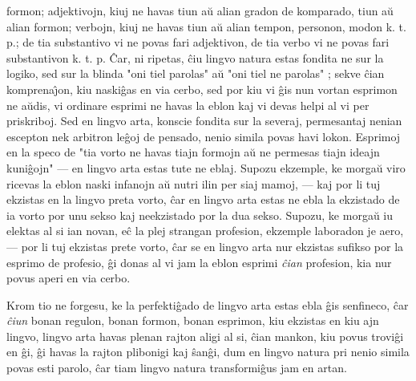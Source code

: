 formon; adjektivojn, kiuj ne havas tiun a\u u alian gradon de
komparado, tiun a\u u alian formon; verbojn, kiuj ne havas tiun a\u
u alian tempon, personon, modon k. t. p.; de tia substantivo vi ne
povas fari adjektivon, de tia verbo vi ne povas fari substantivon k.
t. p. \^Car, ni ripetas, \^ciu lingvo natura estas fondita ne sur la
logiko, sed sur la blinda "oni tiel parolas" a\u u "oni tiel ne
parolas" ; sekve \^cian komprena\^{\j}on, kiu naski\^gas en via
cerbo, sed por kiu vi \^gis nun vortan esprimon ne a\u udis, vi
ordinare esprimi ne havas la eblon kaj vi devas helpi al vi per
priskriboj. Sed en lingvo arta, konscie fondita sur la severaj,
permesantaj nenian escepton nek arbitron le\^goj de pensado, nenio
simila povas havi lokon. Esprimoj en la speco de "tia vorto ne
havas tiajn formojn a\u u ne permesas tiajn ideajn kuni\^gojn" ---
en lingvo arta estas tute ne eblaj. Supozu ekzemple, ke morga\u u
viro ricevas la eblon naski infanojn a\u u nutri ilin per siaj
mamoj, --- kaj por li tuj ekzistas en la lingvo preta vorto, \^car
en lingvo arta estas ne ebla la ekzistado de ia vorto por unu sekso
kaj neekzistado por la dua sekso. Supozu, ke morga\u u iu elektas al
si ian novan, e\^c la plej strangan profesion, ekzemple laboradon je
aero, --- por li tuj ekzistas prete vorto, \^car se en lingvo arta
nur ekzistas sufikso por la esprimo de profesio, \^gi donas al vi
jam la eblon esprimi {\sl \^cian} profesion, kia nur povus aperi en
via cerbo.

   Krom tio ne forgesu, ke la perfekti\^gado de lingvo arta estas
ebla \^gis senfineco, \^car {\sl \^ciun} bonan regulon, bonan
formon, bonan esprimon, kiu ekzistas en kiu ajn lingvo, lingvo arta
havas plenan rajton aligi al si, \^cian mankon, kiu povus trovi\^gi
en \^gi, \^gi havas la rajton plibonigi kaj \^san\^gi, dum en lingvo
natura pri nenio simila povas esti parolo, \^car tiam lingvo natura
transformi\^gus jam en artan.


